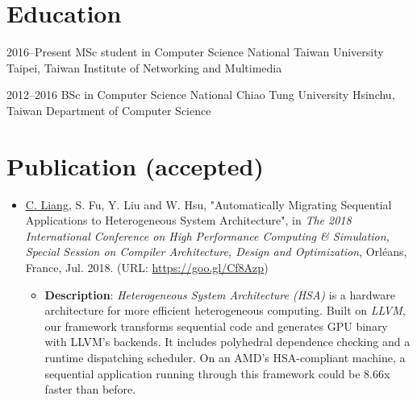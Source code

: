 \documentclass[11pt,a4paper,sans,english]{moderncv}
\begin{document}

\makecvtitle

\section{Education}
    \cventry
        {2016--Present} %
        {MSc student in Computer Science} %
        {National Taiwan University} %
        {Taipei, Taiwan} %
        {Institute of Networking and Multimedia} %
        {}

    \cventry
        {2012--2016}
        {BSc in Computer Science}
        {National Chiao Tung University}
        {Hsinchu, Taiwan}
        {Department of Computer Science}
        {%
        }
        
\section{Publication (accepted)}
    \begin{itemize}
    \item \underline{C. Liang}, S. Fu, Y. Liu and W. Hsu, "Automatically Migrating Sequential Applications to Heterogeneous System Architecture", in \textit{The 2018 International Conference on High Performance Computing \& Simulation, Special Session on Compiler Architecture, Design and Optimization}, Orléans, France, Jul. 2018. (URL: \href{https://goo.gl/Cf8Azp}{https://goo.gl/Cf8Azp})
        \begin{itemize}
        \item \textbf{Description}: \textit{Heterogeneous System Architecture (HSA)} is a hardware architecture for more efficient heterogeneous computing. Built on \textit{LLVM}, our framework transforms sequential code and generates GPU binary with LLVM's backends. It includes polyhedral dependence checking and a runtime dispatching scheduler. On an AMD's HSA-compliant machine, a sequential application running through this framework could be 8.66x faster than before.
        \end{itemize}
    \end{itemize}
    
\end{document}

